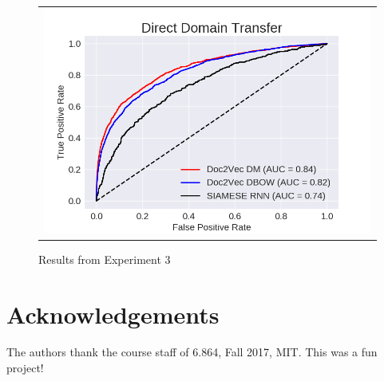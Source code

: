 \documentclass{sigkddExp}
\begin{document}
\begin{figure}[h]
\begin{tabular}{c}
    \includegraphics[width=\columnwidth]{img/report_da_roc_part3.png}
\end{tabular}
\label{fig:exp3}
\caption{Results from Experiment 3}
\end{figure}




\section{Acknowledgements}
\label{ack}
The authors thank the course staff of 6.864, Fall 2017, MIT. This was a fun project!

%

%
%

\end{document}
